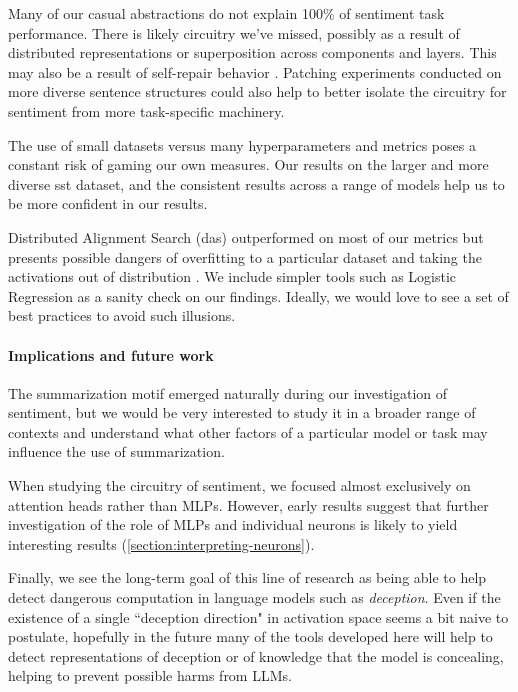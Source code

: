 \documentclass{article} %
\begin{document}
Many of our casual abstractions do not explain 100\% of sentiment task performance. There is likely circuitry we've missed, possibly as a result of distributed representations or superposition \citep{elhage2022superposition} across components and layers. This may also be a result of self-repair behavior \citep{ioi, mcgrath2023hydra}. Patching experiments conducted on more diverse sentence structures could also help to better isolate the circuitry for sentiment from more task-specific machinery.

The use of small datasets versus many hyperparameters and metrics poses a constant risk of gaming our own measures. Our results on the larger and more diverse \gls{sst} dataset, and the consistent results across a range of models help us to be more confident in our results.

Distributed Alignment Search (\gls{das}) outperformed on most of our metrics but presents possible dangers of overfitting to a particular dataset and taking the activations out of distribution \citep{lange2023interpretability}. We include simpler tools such as Logistic Regression as a sanity check on our findings. Ideally, we would love to see a set of best practices to avoid such illusions.

\paragraph{Implications and future work}
The summarization motif emerged naturally during our investigation of sentiment, but we would be very interested to study it in a broader range of contexts and understand what other factors of a particular model or task may influence the use of summarization.

When studying the circuitry of sentiment, we focused almost exclusively on attention heads rather than MLPs. However, early results suggest that further investigation of the role of MLPs and individual neurons is likely to yield interesting results (\ref{section:interpreting-neurons}).

Finally, we see the long-term goal of this line of research as being able to help detect dangerous computation in language models such as \textit{deception}. Even if the existence of a single ``deception direction" in activation space seems a bit naive to postulate, hopefully in the future many of the tools developed here will help to detect representations of deception or of knowledge that the model is concealing, helping to prevent possible harms from LLMs.
\end{document}

